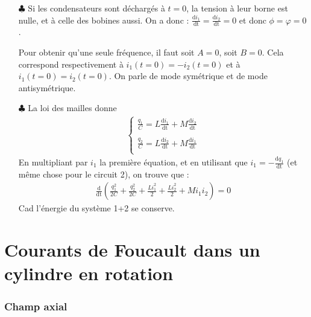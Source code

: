 \documentclass{report}
\begin{document}
\begin{itemize}
	\item[$\clubsuit$] Si les condensateurs sont déchargés à $t=0$, la tension à leur borne est nulle, et à celle des bobines aussi. On a donc : $\frac{\mathrm{d}i_1}{\mathrm{dt}}=\frac{\mathrm{d}i_2}{\mathrm{dt}}=0$ et donc $\phi=\varphi=0$.
	
	Pour obtenir qu'une seule fréquence, il faut soit $A=0$, soit $B=0$. Cela correspond respectivement à $i_1(t=0)=-i_2(t=0)$ et à $i_1(t=0)=i_2(t=0)$. On parle de mode symétrique et de mode antisymétrique. 
	
	\item[$\clubsuit$] La loi des mailles donne
		\begin{align*}
	\left\lbrace
	\begin{array}{ccc}
	\frac{q_1}{C}=L\frac{\mathrm{d}i_1}{\mathrm{dt}}+M\frac{\mathrm{d}i_2}{\mathrm{dt}}\\
	\\
	\frac{q_2}{C}=L\frac{\mathrm{d}i_2}{\mathrm{dt}}+M\frac{\mathrm{d}i_1}{\mathrm{dt}}\\
	\end{array}\right.
	\end{align*}		
En multipliant par $i_1$ la première équation, et en utilisant que $i_1=-\frac{\mathrm{d}q_1}{\mathrm{dt}}$ (et même chose pour le circuit 2), on trouve que :
\begin{align*}
	\frac{\mathrm{d}}{\mathrm{dt}}\left(\frac{q_1^2}{2C}+\frac{q_2^2}{2C}+\frac{Li_1^2}{2}+\frac{Li_2^2}{2}+Mi_1i_2 \right) =0
\end{align*}
Cad l'énergie du système 1+2 se conserve.
	 
\end{itemize}

\section*{Courants de Foucault dans un cylindre en rotation}

\subsubsection*{Champ axial}
\end{document}
